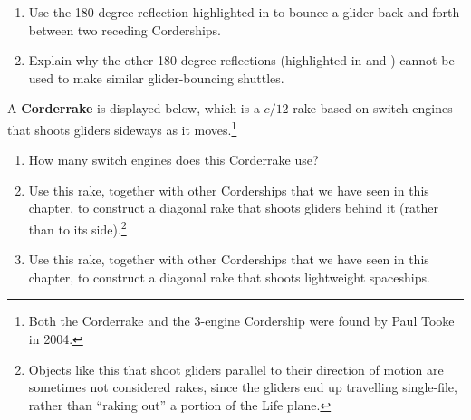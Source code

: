 \begin{multicols}{2}
\begin{problemstar}
		\begin{center}
		\end{center}
		
		\begin{enumerate}[label=\bf\color{ocre}(\alph*)]
			\item Use the 180-degree reflection highlighted in  to bounce a glider back and forth between two receding Corderships.
			
			\item Explain why the other 180-degree reflections (highlighted in  and ) cannot be used to make similar glider-bouncing shuttles.
		\end{enumerate}
	\end{problemstar}
	
	
	\mfilbreak
	
	
	\begin{problemstar}\label{exer:corderrake} 
		A \textbf{Corderrake} is displayed below, which is a $c/12$ rake based on switch engines that shoots gliders sideways as it moves.\footnote{Both the Corderrake and the 3-engine Cordership were found by Paul Tooke in 2004.} %
		
		\begin{center}
		\end{center}
		
		\begin{enumerate}[label=\bf\color{ocre}(\alph*)]
			\item How many switch engines does this Corderrake use?
			
			\item Use this rake, together with other Corderships that we have seen in this chapter, to construct a diagonal rake that shoots gliders behind it (rather than to its side).\footnote{Objects like this that shoot gliders parallel to their direction of motion are sometimes not considered rakes, since the gliders end up travelling single-file, rather than ``raking out'' a portion of the Life plane.}
			
			\item Use this rake, together with other Corderships that we have seen in this chapter, to construct a diagonal rake that shoots lightweight spaceships.
		\end{enumerate}
	\end{problemstar}
	

\end{multicols}
